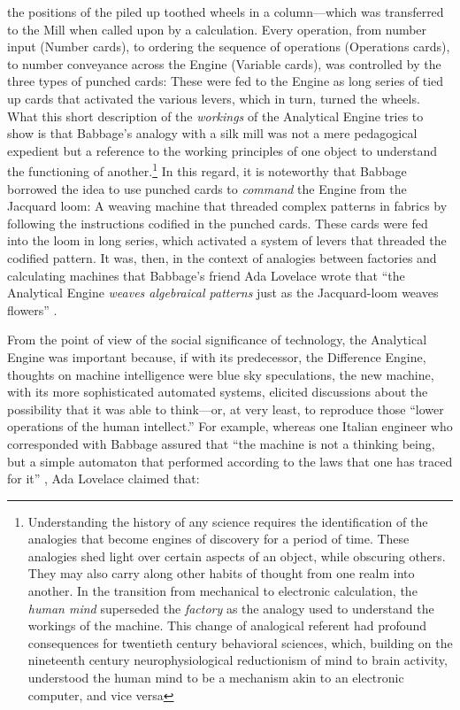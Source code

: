 \documentclass[version=last,draft=false,paper=A4,portrait,twoside=true,twocolumn=false,headinclude=false,footinclude=false,mpinclude=true,fontsize=12,BCOR=20mm,DIV=calc,pagesize=auto,open=right,chapterprefix=true,numbers=autoendperiod,headsepline=false,headings=twolinechapter,parskip=false]{scrbook}
\begin{document}
the positions of the piled up toothed wheels in a column---which was
transferred to the Mill when called upon by a calculation. Every operation,
from number input (Number cards), to ordering the sequence of operations
(Operations cards), to number conveyance across the Engine (Variable
cards), was controlled by the three types of punched cards: These were fed
to the Engine as long series of tied up cards that activated the various
levers, which in turn, turned the wheels. What this short description of
the \emph{workings} of the Analytical Engine tries to show is that Babbage's
analogy with a silk mill was not a mere pedagogical expedient but a
reference to the working principles of one object to understand the
functioning of another.\footnote{Understanding the history of any science requires the
identification of the analogies that become engines of discovery for a
period of time. These analogies shed light over certain aspects of an
object, while obscuring others. They may also carry along other habits of
thought from one realm into another. In the transition from mechanical to
electronic calculation, the \emph{human mind} superseded the \emph{factory} as the
analogy used to understand the workings of the machine. This change of
analogical referent had profound consequences for twentieth century
behavioral sciences, which, building on the nineteenth century
neurophysiological reductionism of mind to brain activity, understood the
human mind to be a mechanism akin to an electronic computer, and vice versa} In this regard, it is noteworthy that
Babbage borrowed the idea to use punched cards to \emph{command} the Engine from
the Jacquard loom: A weaving machine that threaded complex patterns in
fabrics by following the instructions codified in the punched cards. These
cards were fed into the loom in long series, which activated a system of
levers that threaded the codified pattern. It was, then, in the context of
analogies between factories and calculating machines that Babbage's friend
Ada Lovelace wrote that ``the Analytical Engine \emph{weaves algebraical patterns}
just as the Jacquard-loom weaves flowers'' \autocite[p.
25]{lovelace1843}.

From the point of view of the social significance of technology, the
Analytical Engine was important because, if with its predecessor, the
Difference Engine, thoughts on machine intelligence were blue sky
speculations, the new machine, with its more sophisticated automated
systems, elicited discussions about the possibility that it was able to
think---or, at very least, to reproduce those ``lower operations of the
human intellect.'' For example, whereas one Italian engineer who
corresponded with Babbage assured that ``the machine is not a thinking
being, but a simple automaton that performed according to the laws that one
has traced for it'' \autocite[my translation, p. 358]{menabrea1842}, Ada
Lovelace claimed that:
\end{document}
